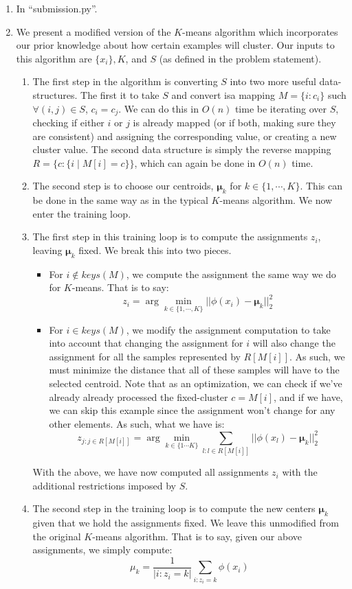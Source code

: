 \documentclass[12pt]{article}
\begin{document}
\begin{enumerate}[label=(\alph*)]
    \item In ``submission.py''.
    \item We present a modified version of the $K$-means algorithm which incorporates our prior knowledge about how certain examples will cluster. Our inputs to this algorithm are $\{ x_i \}, K$, and $S$ (as defined in the problem statement).
      \begin{enumerate}
        \item The first step in the algorithm is converting $S$ into two more useful data-structures. The first it to take $S$ and convert isa mapping $M = \{i : c_i\}$ such $\forall (i, j) \in S$, $c_i = c_j$. We can do this in $O(n)$ time be iterating over $S$, checking if either $i$ or $j$ is already mapped (or if both, making sure they are consistent) and assigning the corresponding value, or creating a new cluster value. The second data structure is simply the reverse mapping $R = \{c : \{i \mid M[i] = c \} \}$, which can again be done in $O(n)$ time.
        \item The second step is to choose our centroids, $\bm{\mu}_k$ for $k \in \{1, \cdots, K\}$. This can be done in the same way as in the typical $K$-means algorithm. We now enter the training loop.
        \item The first step in this training loop is to compute the assignments $z_i$, leaving $\bm{\mu}_k$ fixed. We break this into two pieces.
          \begin{itemize}
            \item For $i \notin keys(M)$, we compute the assignment the same way we do for $K$-means. That is to say:
              $$
                z_i = \arg\min_{k \in \{1,\cdots,K \}} || \phi(x_i) - \bm{\mu}_k ||_2^2
              $$
            \item For $i \in keys(M)$, we modify the assignment computation to take into account that changing the assignment for $i$ will also change the assignment for all the samples represented by $R[M[i]]$. As such, we must minimize the distance that all of these samples will have to the selected centroid. Note that as an optimization, we can check if we've already already processed the fixed-cluster $c = M[i]$, and if we have, we can skip this example since the assignment won't change for any other elements. As such, what we have is:
              $$
                z_{j : j \in R[M[i]]} = \arg\min_{k \in \{1 \cdots K \}} \sum_{l : l \in R[M[i]]} || \phi(x_{l}) - \bm{\mu}_k ||_2^2
              $$
          \end{itemize}
          With the above, we have now computed all assignments $z_i$ with the additional restrictions imposed by $S$.
        \item The second step in the training loop is to compute the new centers $\bm{\mu}_k$ given that we hold the assignments fixed. We leave this unmodified from the original $K$-means algorithm. That is to say, given our above assignments, we simply compute:
          $$
            \mu_k = \frac{1}{| i : z_i = k|}\sum_{i : z_i = k} \phi(x_i)
          $$
      \end{enumerate}


\end{enumerate}
\end{document}
